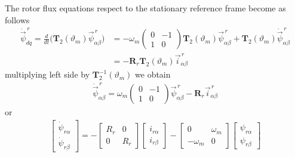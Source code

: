 \documentclass[12pt,a4paper,oneside]{book}
\begin{document}
\begin{onehalfspace}
The rotor flux equations respect to the stationary reference frame become as 
follows
\begin{equation}\label{im_eq_17}
	\begin{aligned}
		\dot{\vec{\psi}}_{dq}^{\,r}=\frac{d}{dt}\Bigg(\mathbf{T}_2(\vartheta_m) 
		{\vec{\psi}}_{\alpha\beta}^{\,r}\Bigg)&=-\omega_m\begin{pmatrix}
			0&-1\\1&0\end{pmatrix}\mathbf{T}_2(\vartheta_m){\vec{\psi}}_{\alpha\beta}^{\,r}
		+\mathbf{T}_2(\vartheta_m)\dot{\vec{\psi}}_{\alpha\beta}^{\,r}\\[8pt]
		&=-\mathbf{R}_r\mathbf{T}_2(\vartheta_m){\vec{i}}_{\alpha\beta}^{\,r}
	\end{aligned}
\end{equation}
multiplying left side by $\mathbf{T}_2^{-1}(\vartheta_m)$ we obtain
\begin{equation}\label{im_eq_18}
	\begin{aligned}
		\dot{\vec{\psi}}_{\alpha\beta}^{\,r}=\omega_m\begin{pmatrix} 
			0&-1\\1&0\end{pmatrix} 
		{\vec{\psi}}_{\alpha\beta}^{\,r}-\mathbf{R}_r{\vec{i}}_{\alpha\beta}^{\,r}
	\end{aligned}
\end{equation}
or
\begin{equation}\label{im_eq_19}
	\begin{aligned}
		\left[
		\begin{matrix}
			\dot{\psi}_{r\alpha} \\[6pt]
			\dot{\psi}_{r\beta}
		\end{matrix} \right] = -
		\left[
		\begin{matrix}
			R_r & 0 \\[6pt]
			0 & R_r 
		\end{matrix} \right]
		\left[
		\begin{matrix}
			i_{r\alpha} \\[6pt]
			i_{r\beta}
		\end{matrix} \right] - 
		\left[
		\begin{matrix}
			0 & \omega_m \\[6pt]
			- \omega_m & 0
		\end{matrix} \right]
		\left[
		\begin{matrix}
			{\psi}_{r\alpha} \\[6pt]
			{\psi}_{r\beta}
		\end{matrix} \right]
	\end{aligned}
\end{equation}



\end{onehalfspace}
\end{document}
